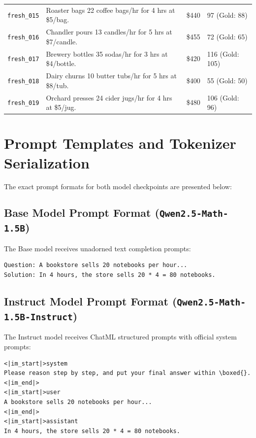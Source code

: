 \documentclass[11pt,letterpaper]{article}
\newcommand{\modelbase}{\texttt{Qwen2.5-Math-1.5B}}
\newcommand{\modelinstruct}{\texttt{Qwen2.5-Math-1.5B-Instruct}}
\begin{document}
\begin{longtable}{p{2.5cm}p{7.5cm}p{2.0cm}p{2.0cm}}
\texttt{fresh\_015} & Roaster bags 22 coffee bags/hr for 4 hrs at \$5/bag. & \$440 & 97 (Gold: 88) \\
\texttt{fresh\_016} & Chandler pours 13 candles/hr for 5 hrs at \$7/candle. & \$455 & 72 (Gold: 65) \\
\texttt{fresh\_017} & Brewery bottles 35 sodas/hr for 3 hrs at \$4/bottle. & \$420 & 116 (Gold: 105) \\
\texttt{fresh\_018} & Dairy churns 10 butter tubs/hr for 5 hrs at \$8/tub. & \$400 & 55 (Gold: 50) \\
\texttt{fresh\_019} & Orchard presses 24 cider jugs/hr for 4 hrs at \$5/jug. & \$480 & 106 (Gold: 96) \\
\end{longtable}

\section{Prompt Templates and Tokenizer Serialization}
\label{app:prompts}
The exact prompt formats for both model checkpoints are presented below:

\subsection{Base Model Prompt Format (\modelbase)}
The Base model receives unadorned text completion prompts:
\begin{verbatim}
Question: A bookstore sells 20 notebooks per hour...
Solution: In 4 hours, the store sells 20 * 4 = 80 notebooks.
\end{verbatim}

\subsection{Instruct Model Prompt Format (\modelinstruct)}
The Instruct model receives ChatML structured prompts with official system prompts:
\begin{verbatim}
<|im_start|>system
Please reason step by step, and put your final answer within \boxed{}.
<|im_end|>
<|im_start|>user
A bookstore sells 20 notebooks per hour...
<|im_end|>
<|im_start|>assistant
In 4 hours, the store sells 20 * 4 = 80 notebooks.
\end{verbatim}
\end{document}
